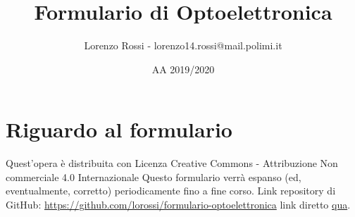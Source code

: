 \documentclass{article}
\title{Formulario di Optoelettronica}
\author{Lorenzo Rossi - lorenzo14.rossi@mail.polimi.it}
\date{AA 2019/2020}
\begin{document}
\maketitle

\section{Riguardo al formulario}
Quest'opera è distribuita con Licenza Creative Commons - Attribuzione Non commerciale 4.0 Internazionale \ccbynceu  \newline
Questo formulario verrà espanso (ed, eventualmente, corretto) periodicamente fino a fine corso.
Link repository di GitHub: \url{https://github.com/lorossi/formulario-optoelettronica} link diretto \href{https://github.com/lorossi/formulario-optoelettronica/blob/master/formulario_optoelettronica.pdf}{qua}. \newline 
\end{document}
